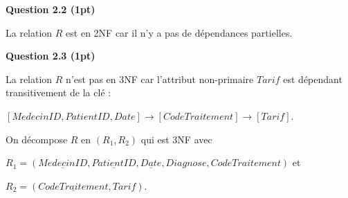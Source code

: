 \documentclass{article}
\begin{document}
\vspace{0.3cm}
\noindent
\textbf{Question 2.2 (1pt)}

\noindent
La relation $R$ est en 2NF car il n'y a pas de dépendances partielles.

\vspace{0.3cm}
\noindent
\textbf{Question 2.3 (1pt)}

\noindent
La relation $R$ n'est pas en 3NF car l'attribut non-primaire $Tarif$ est dépendant transitivement de la clé :

\noindent
$[MedecinID, PatientID, Date] \rightarrow [CodeTraitement] \rightarrow [Tarif]$.

\noindent
On décompose $R$ en $(R_1,R_2)$ qui est 3NF avec

\noindent
$R_{1} =
(\underline{MedecinID}, \underline{PatientID}, \underline{Date}, Diagnose, CodeTraitement)$ et

\noindent
$R_{2} =
(\underline{CodeTraitement}, Tarif)$.
\end{document}

